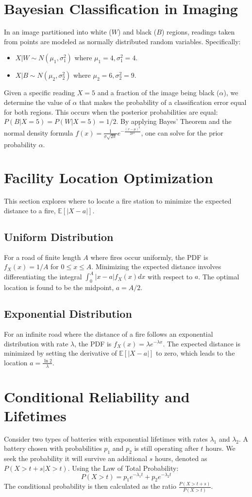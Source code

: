 \documentclass[11pt]{article}
\begin{document}
\section{Bayesian Classification in Imaging}
In an image partitioned into white ($W$) and black ($B$) regions, readings taken from points are modeled as normally distributed random variables. Specifically:
\begin{itemize}
    \item $X|W \sim N(\mu_1, \sigma_1^2)$ where $\mu_1=4, \sigma_1^2=4$.
    \item $X|B \sim N(\mu_2, \sigma_2^2)$ where $\mu_2=6, \sigma_2^2=9$.
\end{itemize}
Given a specific reading $X=5$ and a fraction of the image being black ($\alpha$), we determine the value of $\alpha$ that makes the probability of a classification error equal for both regions. This occurs when the posterior probabilities are equal: $P(B|X=5) = P(W|X=5) = 1/2$. By applying Bayes' Theorem and the normal density formula $f(x) = \frac{1}{\sigma\sqrt{2\pi}}e^{-\frac{(x-\mu)^2}{2\sigma^2}}$, one can solve for the prior probability $\alpha$.

\section{Facility Location Optimization}
This section explores where to locate a fire station to minimize the expected distance to a fire, $\mathbb{E}[|X-a|]$.
\subsection{Uniform Distribution}
For a road of finite length $A$ where fires occur uniformly, the PDF is $f_X(x) = 1/A$ for $0 \le x \le A$. Minimizing the expected distance involves differentiating the integral $\int_{0}^{A} |x-a| f_X(x) dx$ with respect to $a$. The optimal location is found to be the midpoint, $a = A/2$.

\subsection{Exponential Distribution}
For an infinite road where the distance of a fire follows an exponential distribution with rate $\lambda$, the PDF is $f_X(x) = \lambda e^{-\lambda x}$. The expected distance is minimized by setting the derivative of $\mathbb{E}[|X-a|]$ to zero, which leads to the location $a = \frac{\ln 2}{\lambda}$.

\section{Conditional Reliability and Lifetimes}
Consider two types of batteries with exponential lifetimes with rates $\lambda_1$ and $\lambda_2$. A battery chosen with probabilities $p_1$ and $p_2$ is still operating after $t$ hours. We seek the probability it will survive an additional $s$ hours, denoted as $P(X > t+s | X > t)$. Using the Law of Total Probability:
$$P(X > t) = p_1 e^{-\lambda_1 t} + p_2 e^{-\lambda_2 t}$$
The conditional probability is then calculated as the ratio $\frac{P(X > t+s)}{P(X > t)}$.
\end{document}
